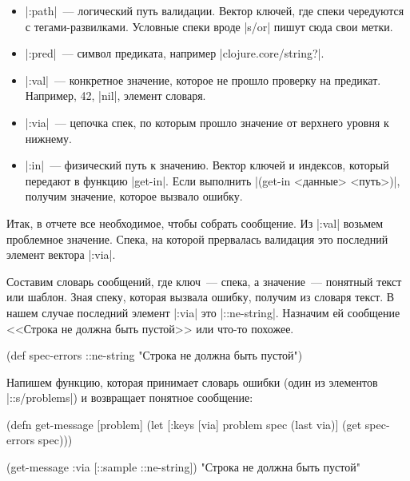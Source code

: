 \begin{itemize}

\item
  \spverb|:path|~--- логический путь валидации. Вектор ключей, где спеки
  чередуются с тегами-развилками. Условные спеки вроде \spverb|s/or| пишут сюда
  свои метки.

\item
  \spverb|:pred|~--- символ предиката, например \spverb|clojure.core/string?|.

\item
  \spverb|:val|~--- конкретное значение, которое не прошло проверку на
  предикат. Например, 42, \spverb|nil|, элемент словаря.

\item
  \spverb|:via|~--- цепочка спек, по которым прошло значение от верхнего уровня
  к нижнему.

\item
  \spverb|:in|~--- физический путь к значению. Вектор ключей и индексов, который
  передают в функцию \spverb|get-in|. Если выполнить \spverb|(get-in <данные> <путь>)|,
  получим значение, которое вызвало ошибку.

\end{itemize}

Итак, в отчете все необходимое, чтобы собрать сообщение. Из \spverb|:val|
возьмем проблемное значение. Спека, на которой прервалась валидация это
последний элемент вектора \spverb|:via|.

Составим словарь сообщений, где ключ~--- спека, а значение~--- понятный текст
или шаблон. Зная спеку, которая вызвала ошибку, получим из словаря текст. В
нашем случае последний элемент \spverb|:via| это \spverb|::ne-string|. Назначим
ей сообщение <<Строка не должна быть пустой>> или что-то похожее.

  \begin{clojure}
(def spec-errors
  {::ne-string "Строка не должна быть пустой"})
  \end{clojure}

Напишем функцию, которая принимает словарь ошибки (один из элементов
\spverb|::s/problems|) и возвращает понятное сообщение:

  \begin{clojure}
(defn get-message [problem]
  (let [{:keys [via]} problem
        spec (last via)]
    (get spec-errors spec)))

(get-message {:via [::sample ::ne-string]})
"Строка не должна быть пустой"
  \end{clojure}

